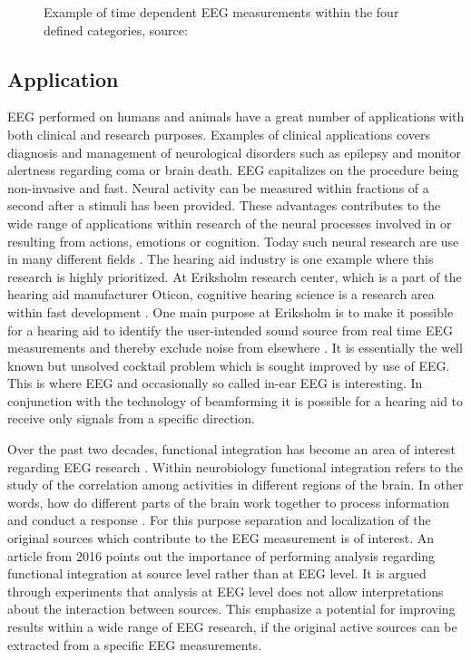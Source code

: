 \begin{figure}[H]
\begin{minipage}[t]{.45\textwidth}
        \caption{Example of time dependent EEG measurements within the four defined categories, source: \cite{EEGsignalprocessing}}\label{fig:EEG_example}
    \end{minipage}
\end{figure}

\subsection{Application}\label{seg:application}
EEG performed on humans and animals have a great number of applications with both clinical and research purposes. 
Examples of clinical applications covers diagnosis and management of neurological disorders such as epilepsy and monitor alertness regarding coma or brain death.
EEG capitalizes on the procedure being non-invasive and fast.
Neural activity can be measured within fractions of a second after a stimuli has been provided. 
These advantages contributes to the wide range of applications within research of the neural processes involved in or resulting from actions, emotions or  cognition. Today such neural research are use in many different fields \cite[p. 4]{fundamentalEEG}.
The hearing aid industry is one example where this research is highly prioritized. 
At Eriksholm research center, which is a part of the hearing aid manufacturer Oticon, cognitive hearing science is a research area within fast development \cite{Weberik}. 
One main purpose at Eriksholm is to make it possible for a hearing aid to identify the user-intended sound source from real time EEG measurements and thereby exclude noise from elsewhere \cite{Emina2019} \cite{Bech2018}. 
It is essentially the well known but unsolved cocktail problem which is sought improved by use of EEG. 
This is where EEG and occasionally so called in-ear EEG is interesting. In conjunction with the technology of beamforming it is possible for a hearing aid to receive only signals from a specific direction. 

Over the past two decades, functional integration has become an area of interest regarding EEG research \cite{Friston2011}. 
Within neurobiology functional integration refers to the study of the correlation among activities in different regions of the brain. 
In other words, how do different parts of the brain work together to process information and conduct a response \cite{Friston2002}.     
For this purpose separation and localization of the original sources which contribute to the EEG measurement is of interest. 
An article from 2016 \cite{Van2019} points out the importance of performing analysis regarding functional integration at source level rather than at EEG level. 
It is argued through experiments that analysis at EEG level does not allow interpretations about the interaction between sources. 
This emphasize a potential for improving results within a wide range of EEG research, if the original active sources can be extracted from a specific EEG measurements.    

